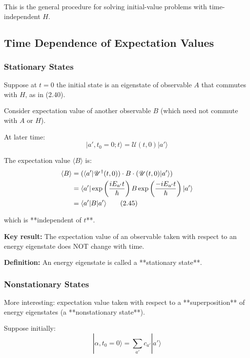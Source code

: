 \documentclass[11pt,a4paper]{article}
\begin{document}
This is the general procedure for solving initial-value problems with time-independent $H$.

\subsection{Time Dependence of Expectation Values}

\subsubsection{Stationary States}

Suppose at $t = 0$ the initial state is an eigenstate of observable $A$ that commutes with $H$, as in (2.40).

Consider expectation value of another observable $B$ (which need not commute with $A$ or $H$).

At later time:
\begin{equation}
|a', t_0 = 0; t\rangle = \mathscr{U}(t, 0)|a'\rangle
\tag{2.44}
\end{equation}

The expectation value $\langle B \rangle$ is:
\begin{align}
\langle B \rangle &= (\langle a'|\mathscr{U}^\dagger(t, 0)) \cdot B \cdot (\mathscr{U}(t, 0)|a'\rangle) \notag \\
&= \langle a'|\exp\left(\frac{iE_{a'}t}{\hbar}\right)B\exp\left(\frac{-iE_{a'}t}{\hbar}\right)|a'\rangle \notag \\
&= \langle a'|B|a'\rangle
\tag{2.45}
\end{align}

which is **independent of $t$**.

\textbf{Key result:} The expectation value of an observable taken with respect to an energy eigenstate does NOT change with time.

\textbf{Definition:} An energy eigenstate is called a **stationary state**.

\subsubsection{Nonstationary States}

More interesting: expectation value taken with respect to a **superposition** of energy eigenstates (a **nonstationary state**).

Suppose initially:
\begin{equation}
|\alpha, t_0 = 0\rangle = \sum_{a'}c_{a'}|a'\rangle
\tag{2.46}
\end{equation}
\end{document}
